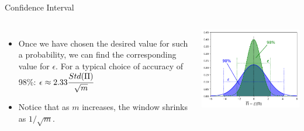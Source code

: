 \documentclass{beamer}
\begin{document}
\begin{frame}{Confidence Interval}
  \begin{columns}
    \begin{itemize}
    \item Once we have chosen the desired value for such a probability, we can find the corresponding value for $\epsilon$. For a typical choice of accuracy of 98\%: $\epsilon \approx 2.33 \cfrac{Std(\Pi)}{\sqrt{m}}$
    \item Notice that as $m$ increases, the window shrinks as $1/\sqrt{m}$.
    \end{itemize}
    \includegraphics[width=0.9\linewidth]{confidence_interval}
  \end{columns}
\end{frame}
\end{document}
